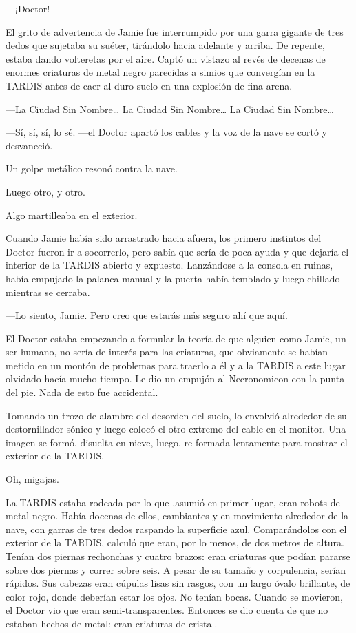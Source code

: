 ---¡Doctor!

El grito de advertencia de Jamie fue interrumpido por una garra gigante
de tres dedos que sujetaba su suéter, tirándolo hacia adelante y arriba.
De repente, estaba dando volteretas por el aire. Captó un vistazo al
revés de decenas de enormes criaturas de metal negro parecidas a simios
que convergían en la TARDIS antes de caer al duro suelo en una explosión
de fina arena.

---La Ciudad Sin Nombre\ldots{} La Ciudad Sin Nombre\ldots{} La Ciudad
Sin Nombre\ldots{}

---Sí, sí, sí, lo sé. ---el Doctor apartó los cables y la voz de la nave
se cortó y desvaneció.

Un golpe metálico resonó contra la nave.

Luego otro, y otro.

Algo martilleaba en el exterior.

Cuando Jamie había sido arrastrado hacia afuera, los primero instintos
del Doctor fueron ir a socorrerlo, pero sabía que sería de poca ayuda y
que dejaría el interior de la TARDIS abierto y expuesto. Lanzándose a la
consola en ruinas, había empujado la palanca manual y la puerta había
temblado y luego chillado mientras se cerraba.~

---Lo siento, Jamie. Pero creo que estarás más seguro ahí que aquí.

El Doctor estaba empezando a formular la teoría de que alguien como
Jamie, un ser humano, no sería de interés para las criaturas, que
obviamente se habían metido en un montón de problemas para traerlo a él
y a la TARDIS a este lugar olvidado hacía mucho tiempo. Le dio un
empujón al Necronomicon con la punta del pie. Nada de esto fue
accidental.

Tomando un trozo de alambre del desorden del suelo, lo envolvió
alrededor de su destornillador sónico y luego colocó el otro extremo del
cable en el monitor. Una imagen se formó, disuelta en nieve, luego,
re-formada lentamente para mostrar el exterior de la TARDIS.

Oh, migajas.

La TARDIS estaba rodeada por lo que ,asumió en primer lugar, eran robots
de metal negro. Había docenas de ellos, cambiantes y en movimiento
alrededor de la nave, con garras de tres dedos raspando la superficie
azul. Comparándolos con el exterior de la TARDIS, calculó que eran, por
lo menos, de dos metros de altura. Tenían dos piernas rechonchas y
cuatro brazos: eran criaturas que podían pararse sobre dos piernas y
correr sobre seis. A pesar de su tamaño y corpulencia, serían rápidos.
Sus cabezas eran cúpulas lisas sin rasgos, con un largo óvalo brillante,
de color rojo, donde deberían estar los ojos. No tenían bocas. Cuando se
movieron, el Doctor vio que eran semi-transparentes. Entonces se dio
cuenta de que no estaban hechos de metal: eran criaturas de cristal.

